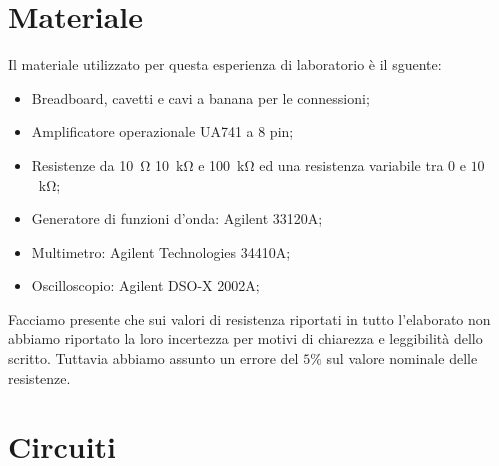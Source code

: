 \section*{Materiale}

Il materiale utilizzato per questa esperienza di laboratorio è il sguente:

\begin{itemize} \itemsep2pt \parskip0pt 
    \item{Breadboard, cavetti e cavi a banana per le connessioni;}
    \item{Amplificatore operazionale UA741 a 8 pin;}
    \item{Resistenze da \SI{10}{\ohm} \SI{10}{\kilo\ohm} e \SI{100}{\kilo\ohm} ed una resistenza variabile tra $0$ e $10$ \SI{}{\kilo\ohm};}
    \item{Generatore di funzioni d'onda: Agilent 33120A;}
    \item{Multimetro: Agilent Technologies 34410A;}
    \item{Oscilloscopio: Agilent DSO-X 2002A;}
\end{itemize}

Facciamo presente che sui valori di resistenza riportati in tutto l'elaborato non abbiamo riportato la loro incertezza per motivi di chiarezza e leggibilità dello scritto. Tuttavia abbiamo assunto un errore del $5\%$ sul valore nominale delle resistenze.

\section*{Circuiti}

